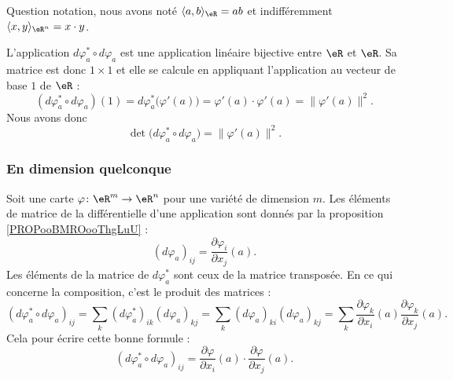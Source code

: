 Question notation, nous avons noté \( \langle a, b\rangle_{\eR}=ab\) et indifféremment \( \langle x, y\rangle_{\eR^n}=x\cdot y\).

L'application \( d\varphi_a^*\circ d\varphi_a\) est une application linéaire bijective entre \( \eR\) et \( \eR\). Sa matrice est donc \( 1\times 1\) et elle se calcule en appliquant l'application au vecteur de base \( 1\) de \( \eR\) :
\begin{equation}
	(d\varphi_a^*\circ d\varphi_a)(1)=d\varphi_a^*\big( \varphi'(a) \big)=\varphi'(a)\cdot \varphi'(a)=\| \varphi'(a) \|^2.
\end{equation}
Nous avons donc
\begin{equation}
	\det\big( d\varphi^*_a\circ d\varphi_a \big)=\| \varphi'(a) \|^2.
\end{equation}

\subsubsection{En dimension quelconque}

Soit une carte \( \varphi\colon \eR^m\to \eR^n\) pour une variété de dimension \( m\). Les éléments de matrice de la différentielle d'une application sont donnés par la proposition \ref{PROPooBMROooThgLuU} :
\begin{equation}
	(d\varphi_a)_{ij}=\frac{ \partial \varphi_i }{ \partial x_j }(a).
\end{equation}
Les éléments de la matrice de \( d\varphi_a^*\) sont ceux de la matrice transposée. En ce qui concerne la composition, c'est le produit des matrices :
\begin{equation}
	(d\varphi_a^*\circ d\varphi_a)_{ij}=\sum_k(d\varphi_a^*)_{ik}(d\varphi_a)_{kj}=\sum_k(d\varphi_a)_{ki}(d\varphi_a)_{kj}=\sum_k\frac{ \partial \varphi_k }{ \partial x_i }(a)\frac{ \partial \varphi_k }{ \partial x_j }(a).
\end{equation}
Cela pour écrire cette bonne formule :
\begin{equation}        \label{EQooQRQKooJVJRsy}
	(d\varphi_a^*\circ d\varphi_a)_{ij}=\frac{ \partial \varphi }{ \partial x_i }(a)\cdot \frac{ \partial \varphi }{ \partial x_j }(a).
\end{equation}

